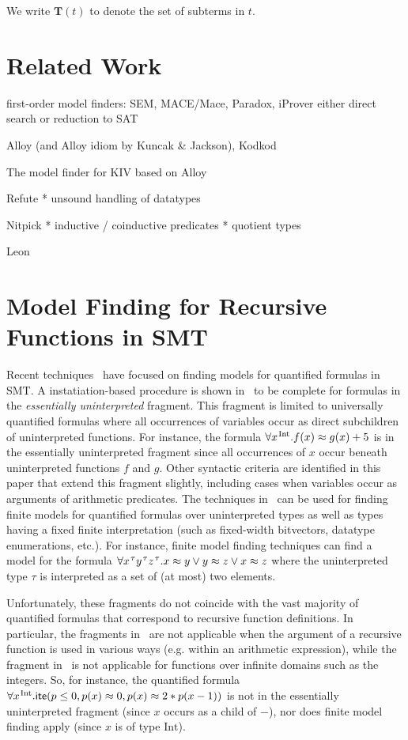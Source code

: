 \documentclass[runningheads,a4paper]{llncs}
\newcommand{\con}[1]{\mathsf{#1}}
\newcommand{\teq}{\approx}
\newcommand{\terms}{\mathbf{T}}
\newcommand{\sfundefs}[1]{#1^\mathrm{df}}
\newcommand{\sortint}{\mathrm{Int}}
\newcommand{\lite}{\con{ite}}
\newcommand{\vthinspace}{\kern+0.083333em}
\newcommand{\typ}[1]{^{\vthinspace #1}}
\begin{document}
We write $\terms( t )$ to denote the set of subterms in $t$.

\section{Related Work}

first-order model finders: SEM, MACE/Mace, Paradox, iProver
  either direct search or reduction to SAT

Alloy (and Alloy idiom by Kuncak \& Jackson), Kodkod

The model finder for KIV based on Alloy

Refute
  * unsound handling of datatypes

Nitpick
  * inductive / coinductive predicates
  * quotient types

Leon

\section{Model Finding for Recursive Functions in SMT}

Recent techniques~\cite{GeDeM-CAV-09, ReyEtAl-1-RR-13} 
have focused on finding models for quantified formulas in SMT.
A instatiation-based procedure is shown in~\cite{GeDeM-CAV-09} to be complete for formulas in the \emph{essentially uninterpreted} fragment.
This fragment is limited to universally quantified formulas where all occurrences of variables occur as direct subchildren of uninterpreted functions.
For instance, the formula $\forall x\typ{\sortint}. f( x ) \teq g( x ) + 5$ 
is in the essentially uninterpreted fragment since all occurrences of $x$ occur beneath uninterpreted functions $f$ and $g$.
Other syntactic criteria are identified in this paper that extend this fragment slightly, including cases when variables occur as arguments of arithmetic predicates.
The techniques in~\cite{ReyEtAl-1-RR-13} can be used for finding finite models for quantified formulas over uninterpreted types as well as types having a 
fixed finite interpretation (such as fixed-width bitvectors, datatype enumerations, etc.).
For instance, 
finite model finding techniques can find a model for
the formula $\forall x\typ{\tau} y\typ{\tau} z\typ{\tau}. x \teq y \vee y \teq z \vee x \teq z$
where the uninterpreted type $\tau$ is interpreted as a set of (at most) two elements.

Unfortunately, these fragments do not coincide with the vast majority of quantified formulas that correspond to recursive function definitions.
In particular, the fragments in~\cite{GeDeM-CAV-09} are not applicable when the argument of a recursive function is used in various ways (e.g. within an arithmetic expression), 
while the fragment in~\cite{ReyEtAl-1-RR-13} is not applicable for functions over infinite domains such as the integers.
So, for instance, the quantified formula $\forall x\typ{\sortint}. \lite( p \leq 0, p( x ) \teq 0, p( x ) \teq 2 * p( x - 1 ) )$ 
is not in the essentially uninterpreted fragment (since $x$ occurs as a child of $-$),
nor does finite model finding apply (since $x$ is of type $\sortint$).
\end{document}

